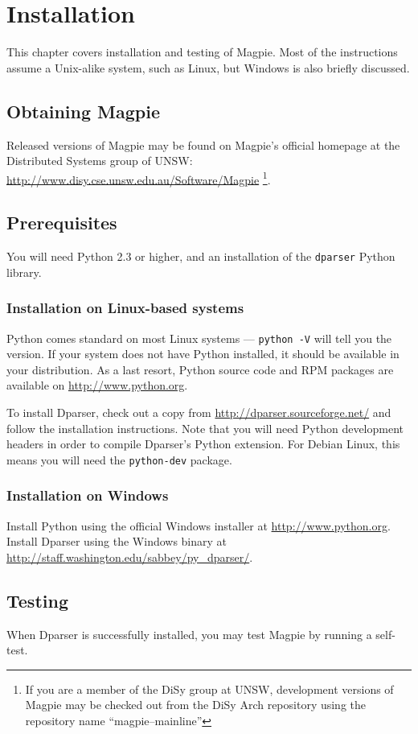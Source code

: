 \chapter{Installation}
This chapter covers installation and testing of Magpie. Most of the instructions assume a Unix-alike system, such as Linux, but Windows is also briefly discussed.

\section{Obtaining Magpie}
Released versions of Magpie may be found on Magpie's official homepage at the Distributed Systems group of UNSW: \url{http://www.disy.cse.unsw.edu.au/Software/Magpie} \footnote{If you are a member of the DiSy group at UNSW, development versions of Magpie may be checked out from the DiSy Arch repository using the repository name ``magpie--mainline''}.

\section{Prerequisites}
You will need Python 2.3 or higher, and an installation of the {\tt dparser} Python library.

\subsection{Installation on Linux-based systems}
Python comes standard on most Linux systems --- {\tt python -V} will tell you the version. If your system does not have Python installed, it should be available in your distribution. As a last resort, Python source code and RPM packages are available on \url{http://www.python.org}.

To install Dparser, check out a copy from \url{http://dparser.sourceforge.net/} and follow the installation instructions. Note that you will need Python development headers in order to compile Dparser's Python extension. For Debian Linux, this means you will need the {\tt python-dev} package.

\subsection{Installation on Windows}
Install Python using the official Windows installer at \url{http://www.python.org}. Install Dparser using the Windows binary at \url{http://staff.washington.edu/sabbey/py\_dparser/}.

\section{Testing}
When Dparser is successfully installed, you may test Magpie by running a self-test.


